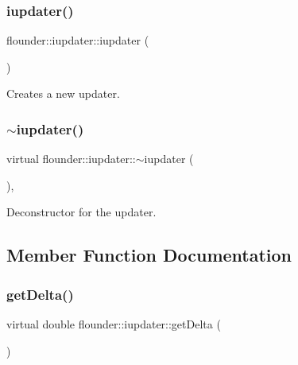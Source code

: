 \subsubsection{\texorpdfstring{iupdater()}{iupdater()}}
{\footnotesize\ttfamily flounder\+::iupdater\+::iupdater (\begin{DoxyParamCaption}{ }\end{DoxyParamCaption})\hspace{0.3cm}{\ttfamily [inline]}}



Creates a new updater. 

\mbox{\label{classflounder_1_1iupdater_a70569371d9b898b7d30442a4463fbee4}} 
\subsubsection{\texorpdfstring{$\sim$iupdater()}{~iupdater()}}
{\footnotesize\ttfamily virtual flounder\+::iupdater\+::$\sim$iupdater (\begin{DoxyParamCaption}{ }\end{DoxyParamCaption})\hspace{0.3cm}{\ttfamily [inline]}, {\ttfamily [virtual]}}



Deconstructor for the updater. 



\subsection{Member Function Documentation}
\mbox{\label{classflounder_1_1iupdater_a1e8d40602f9799fc82d96d5b845cf796}} 
\subsubsection{\texorpdfstring{get\+Delta()}{getDelta()}}
{\footnotesize\ttfamily virtual double flounder\+::iupdater\+::get\+Delta (\begin{DoxyParamCaption}{ }\end{DoxyParamCaption})\hspace{0.3cm}{\ttfamily [pure virtual]}}




